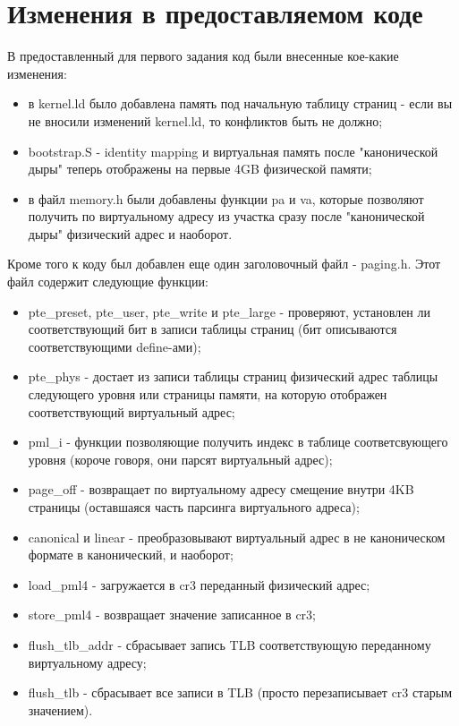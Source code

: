 \section{Изменения в предоставляемом коде}

В предоставленный для первого задания код были внесенные кое-какие изменения:

\begin{itemize}
  \item в kernel.ld было добавлена память под начальную таблицу страниц - если
        вы не вносили изменений kernel.ld, то конфликтов быть не должно;
  \item bootstrap.S - identity mapping и виртуальная память после "канонической
        дыры" теперь отображены на первые 4GB физической памяти;
  \item в файл memory.h были добавлены функции pa и va, которые позволяют
        получить по виртуальному адресу из участка сразу после "канонической
        дыры" физический адрес и наоборот.
\end{itemize}

Кроме того к коду был добавлен еще один заголовочный файл - paging.h. Этот файл
содержит следующие функции:

\begin{itemize}
  \item pte\_preset, pte\_user, pte\_write и pte\_large - проверяют, установлен
        ли соответствующий бит в записи таблицы страниц (бит описываются
        соответствующими define-ами);
  \item pte\_phys - достает из записи таблицы страниц физический адрес таблицы
        следующего уровня или страницы памяти, на которую отображен
        соответствующий виртуальный адрес;
  \item pml\*\_i - функции позволяющие получить индекс в таблице
        соответсвующего уровня (короче говоря, они парсят виртуальный адрес);
  \item page\_off - возвращает по виртуальному адресу смещение внутри 4KB
        страницы (оставшаяся часть парсинга виртуального адреса);
  \item canonical и linear - преобразовывают виртуальный адрес в не каноническом
        формате в канонический, и наоборот;
  \item load\_pml4 - загружается в cr3 переданный физический адрес;
  \item store\_pml4 - возвращает значение записанное в cr3;
  \item flush\_tlb\_addr - сбрасывает запись TLB соответствующую переданному
        виртуальному адресу;
  \item flush\_tlb - сбрасывает все записи в TLB (просто перезаписывает cr3
        старым значением).
\end{itemize}
